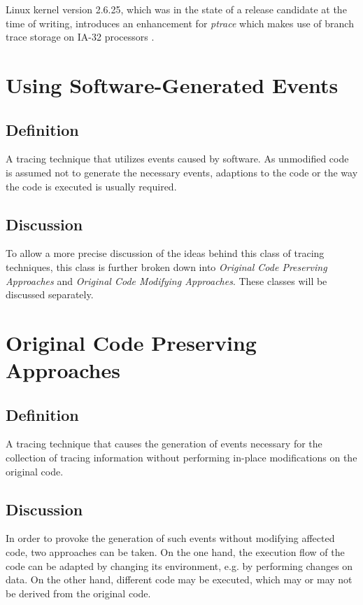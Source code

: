 
Linux kernel version 2.6.25, which was in the state of a release candidate at the time of 
writing, introduces an enhancement for \emph{ptrace} which makes use of branch 
trace storage \cite{intel07_3B} on IA-32 processors \cite{Molnar08}. 





\section{Using Software-Generated Events}
\subsection*{Definition} 
A tracing technique that utilizes events caused by software. As unmodified 
code is assumed not to generate the necessary events, adaptions to the code
or the way the code is executed is usually required.

\subsection*{Discussion}
To allow a more precise discussion of the ideas behind this class of tracing techniques, this class is further 
broken down into \emph{Original Code Preserving Approaches}
and \emph{Original Code Modifying Approaches}. These classes will be discussed
separately.






\section{Original Code Preserving Approaches}
\subsection*{Definition}
A tracing technique that causes the generation of events necessary for the collection of 
tracing information without performing in-place modifications on 
the original code. 

\subsection*{Discussion}
In order to provoke the generation of such events without modifying affected
code, two approaches can be taken. On the one hand, the execution flow of the
code can be adapted by changing its environment, e.g. by performing changes
on data. On the other hand, different code may be executed, which may
or may not be derived from the original code.

